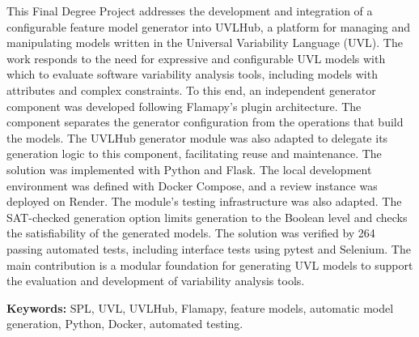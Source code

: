 This Final Degree Project addresses the development and integration of a
configurable feature model generator into UVLHub, a platform for managing and
manipulating models written in the Universal Variability Language (UVL). The
work responds to the need for expressive and configurable UVL models with
which to evaluate software variability analysis tools, including models with
attributes and complex constraints. To this end, an independent generator
component was developed following Flamapy's plugin architecture. The component
separates the generator configuration from the operations that build the
models. The UVLHub generator module was also adapted to delegate its generation
logic to this component, facilitating reuse and maintenance. The solution was
implemented with Python and Flask. The local development environment was
defined with Docker Compose, and a review instance was deployed on Render. The
module's testing infrastructure was also adapted. The SAT-checked generation
option limits generation to the Boolean level and checks the satisfiability of
the generated models. The solution was verified by 264 passing automated tests, including interface tests using pytest and Selenium. The main contribution is a modular foundation for
generating UVL models to support the evaluation and development of variability
analysis tools.

\vspace{1.5em}
\noindent\textbf{Keywords:} SPL, UVL, UVLHub, Flamapy, feature models,
automatic model generation, Python, Docker, automated testing.